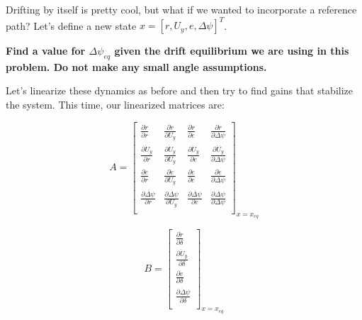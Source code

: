 

Drifting by itself is pretty cool, but what if we wanted to incorporate a reference path? Let's define a new state $x = [r, U_y, e, \Delta\psi]^T$.


\textbf{Find a value for $\Delta \psi_{eq}$ given the drift equilibrium we are using in this problem. Do not make any small angle assumptions.}

Let's linearize these dynamics as before and then try to find gains that stabilize the system. This time, our linearized matrices are:

\begin{equation}
A = 
\begin{bmatrix}
\frac{\partial \dot r}{\partial r}  & \frac{\partial \dot r}{\partial U_y}  & \frac{\partial \dot r}{\partial e} & \frac{\partial \dot r}{\partial \Delta\psi} \\
\frac{\partial \dot U_y}{\partial r}  & \frac{\partial \dot U_y}{\partial U_y}  & \frac{\partial \dot U_y}{\partial e} & \frac{\partial \dot U_y}{\partial \Delta\psi} \\
\frac{\partial \dot e}{\partial r}  & \frac{\partial \dot e}{\partial U_y}  & \frac{\partial \dot e}{\partial e} & \frac{\partial \dot e}{\partial \Delta\psi} \\
\frac{\partial \dot{\Delta\psi}}{\partial r}  & \frac{\partial \dot{\Delta\psi}}{\partial U_y}  & \frac{\partial \dot{\Delta\psi}}{\partial e} & \frac{\partial \dot{\Delta\psi}}{\partial \Delta\psi} \\
\end{bmatrix}_{x=x_{eq}} 
\end{equation}

\begin{equation}
B = \begin{bmatrix}
\frac{\partial \dot r}{\partial \delta} \\
\frac{\partial \dot U_y}{\partial \delta}\\
\frac{\partial \dot e}{\partial \delta} \\
\frac{\partial \dot \Delta\psi}{\partial \delta}\\
\end{bmatrix}_{x=x_{eq}} 
\end{equation}


